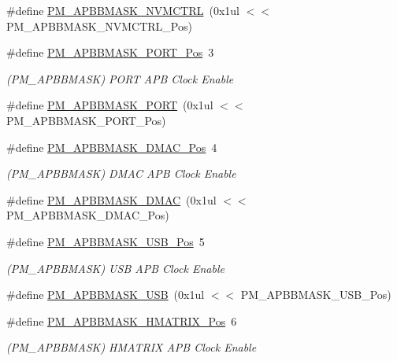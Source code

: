 \begin{DoxyCompactItemize}
\#define \mbox{\hyperlink{group___s_a_m_d21___p_m_ga407da8747aef9e79f3609ba6ba4e1428}{P\+M\+\_\+\+A\+P\+B\+B\+M\+A\+S\+K\+\_\+\+N\+V\+M\+C\+T\+RL}}~(0x1ul $<$$<$ P\+M\+\_\+\+A\+P\+B\+B\+M\+A\+S\+K\+\_\+\+N\+V\+M\+C\+T\+R\+L\+\_\+\+Pos)
\item 
\#define \mbox{\hyperlink{group___s_a_m_d21___p_m_gab46bbad2e722f6b5cfd858afd267f409}{P\+M\+\_\+\+A\+P\+B\+B\+M\+A\+S\+K\+\_\+\+P\+O\+R\+T\+\_\+\+Pos}}~3
\begin{DoxyCompactList}\small\item\em (P\+M\+\_\+\+A\+P\+B\+B\+M\+A\+SK) P\+O\+RT A\+PB Clock Enable \end{DoxyCompactList}\item 
\#define \mbox{\hyperlink{group___s_a_m_d21___p_m_ga0d7e0f887bbcc8ce8798148e0e1b6c1f}{P\+M\+\_\+\+A\+P\+B\+B\+M\+A\+S\+K\+\_\+\+P\+O\+RT}}~(0x1ul $<$$<$ P\+M\+\_\+\+A\+P\+B\+B\+M\+A\+S\+K\+\_\+\+P\+O\+R\+T\+\_\+\+Pos)
\item 
\#define \mbox{\hyperlink{group___s_a_m_d21___p_m_gaf1e8c5ca0d5e0f65065cbd8de7193cbb}{P\+M\+\_\+\+A\+P\+B\+B\+M\+A\+S\+K\+\_\+\+D\+M\+A\+C\+\_\+\+Pos}}~4
\begin{DoxyCompactList}\small\item\em (P\+M\+\_\+\+A\+P\+B\+B\+M\+A\+SK) D\+M\+AC A\+PB Clock Enable \end{DoxyCompactList}\item 
\#define \mbox{\hyperlink{group___s_a_m_d21___p_m_ga7f3ec60920a10d3fd0e8d29e112bebc8}{P\+M\+\_\+\+A\+P\+B\+B\+M\+A\+S\+K\+\_\+\+D\+M\+AC}}~(0x1ul $<$$<$ P\+M\+\_\+\+A\+P\+B\+B\+M\+A\+S\+K\+\_\+\+D\+M\+A\+C\+\_\+\+Pos)
\item 
\#define \mbox{\hyperlink{group___s_a_m_d21___p_m_ga52c7a9b956a8da3732f364597e06a27a}{P\+M\+\_\+\+A\+P\+B\+B\+M\+A\+S\+K\+\_\+\+U\+S\+B\+\_\+\+Pos}}~5
\begin{DoxyCompactList}\small\item\em (P\+M\+\_\+\+A\+P\+B\+B\+M\+A\+SK) U\+SB A\+PB Clock Enable \end{DoxyCompactList}\item 
\#define \mbox{\hyperlink{group___s_a_m_d21___p_m_ga97ade6e1eabfdf5104b4f48c59eb11f5}{P\+M\+\_\+\+A\+P\+B\+B\+M\+A\+S\+K\+\_\+\+U\+SB}}~(0x1ul $<$$<$ P\+M\+\_\+\+A\+P\+B\+B\+M\+A\+S\+K\+\_\+\+U\+S\+B\+\_\+\+Pos)
\item 
\#define \mbox{\hyperlink{group___s_a_m_d21___p_m_ga669022844a217bfcd3e6744d72b0ed57}{P\+M\+\_\+\+A\+P\+B\+B\+M\+A\+S\+K\+\_\+\+H\+M\+A\+T\+R\+I\+X\+\_\+\+Pos}}~6
\begin{DoxyCompactList}\small\item\em (P\+M\+\_\+\+A\+P\+B\+B\+M\+A\+SK) H\+M\+A\+T\+R\+IX A\+PB Clock Enable \end{DoxyCompactList}\item 

\end{DoxyCompactItemize}
